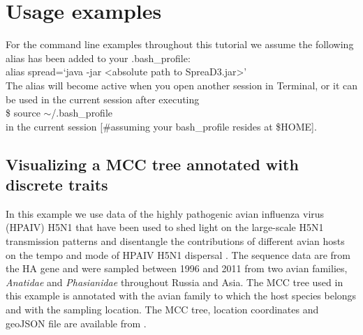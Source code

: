 \documentclass[english]{paper}
\begin{document}
\section{Usage examples}
% 
% 
For the command line examples throughout this tutorial we assume the following alias has been added to your .bash\_profile:
\\
alias spread=`java -jar <absolute path to SpreaD3.jar>' 
\\
The alias will become active when you open another session in Terminal, or it can be used in the current session after executing
\\
\$ source $\sim$/.bash\_profile
\\
in the current session  [\#assuming your bash\_profile resides at \$HOME]. 

\subsection{Visualizing a MCC tree annotated with discrete traits}
% 
% 


In this example we use data of the highly pathogenic avian influenza virus (HPAIV) H5N1 that have been used to shed light on the large-scale H5N1 transmission patterns and disentangle the contributions of different avian hosts on the tempo and mode of HPAIV H5N1 dispersal \citep{Trovao:2015aa}.
The sequence data are from the HA gene and were sampled between 1996 and 2011 from two avian families, \textit{Anatidae} and \textit{Phasianidae} %
 throughout Russia and Asia.
The MCC tree used in this example is annotated with the avian family to which the host species belongs and with the sampling location.
The MCC tree, location coordinates and geoJSON file are available from \url{}.
\end{document}
